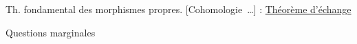 

Th. fondamental des morphismes propres. [Cohomologie \,\ldots] : \uline{Théorème d'échange}

Questions marginales


